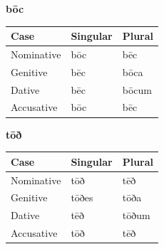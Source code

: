 \par\begin{minipage}{\linewidth}\raggedright
\textbf{bōc}

\par\begingroup
\fontsize{10.5}{13.2}\selectfont
\setlength{\LTleft}{0pt}\setlength{\LTright}{\fill}
\noindent
\begin{tabular}{@{}>{\raggedright\arraybackslash}p{39.46mm}>{\raggedright\arraybackslash}p{39.46mm}>{\raggedright\arraybackslash}p{39.46mm}@{}}
\toprule
\textbf{Case} & \textbf{Singular} & \textbf{Plural} \\
\midrule
Nominative & bōc & bēc \\
Genitive & bēc & bōca \\
Dative & bēc & bōcum \\
Accusative & bōc & bēc \\
\bottomrule
\end{tabular}
\par\endgroup

\textbf{tōð}

\par\begingroup
\fontsize{10.5}{13.2}\selectfont
\setlength{\LTleft}{0pt}\setlength{\LTright}{\fill}
\noindent
\begin{tabular}{@{}>{\raggedright\arraybackslash}p{39.46mm}>{\raggedright\arraybackslash}p{39.46mm}>{\raggedright\arraybackslash}p{39.46mm}@{}}
\toprule
\textbf{Case} & \textbf{Singular} & \textbf{Plural} \\
\midrule
Nominative & tōð & tēð \\
Genitive & tōðes & tōða \\
Dative & tēð & tōðum \\
Accusative & tōð & tēð \\
\bottomrule
\end{tabular}
\par\endgroup


\end{minipage}
